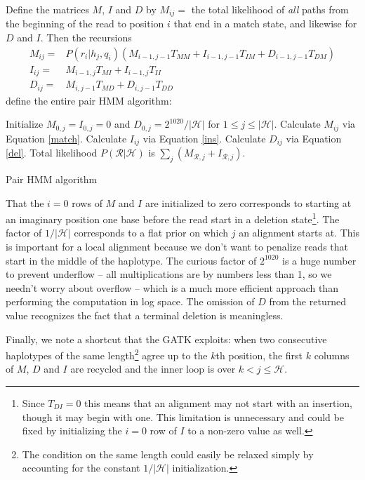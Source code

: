 \documentclass[nofootinbib,amssymb,amsmath]{revtex4}
\newcommand{\mc}[1]{\mathcal{#1}}
\begin{document}
Define the matrices $M$, $I$ and $D$ by $M_{ij} = $ the total likelihood of \textit{all} paths from the beginning of the read to position $i$ that end in a match state, and likewise for $D$ and $I$.  Then the recursions
\begin{align}
M_{ij} =& P(r_i | h_j, q_i) \left( M_{i-1,j-1} T_{MM} + I_{i-1,j-1} T_{IM} + D_{i-1,j-1} T_{DM} \right) \label{match} \\
I_{ij} =& M_{i-1,j} T_{MI} + I_{i-1,j} T_{II} \label{ins} \\
D_{ij} =& M_{i,j-1} T_{MD} + D_{i, j - 1} T_{DD} \label{del}
\end{align}
define the entire pair HMM algorithm:

\begin{algorithm}
\begin{algorithmic}[1]
\State Initialize $M_{0,j} = I_{0,j} = 0$ and $D_{0,j} = 2^{1020}/|\mc{H}|$ for $1 \le j \le |\mc{H}|$.
\For{$1 \le i \le | \mc{R} |$}
	\For{$1 \le j \le | \mc{H} |$}
		\State Calculate $M_{ij}$ via Equation \ref{match}.
		\State Calculate $I_{ij}$ via Equation \ref{ins}.
		\State Calculate $D_{ij}$ via Equation \ref{del}.
	\EndFor
\EndFor
\State Total likelihood $P(\mc{R} | \mc{H})$ is $\sum_j \left(M_{\mc{R},j} + I_{\mc{R},j} \right)$.
\end{algorithmic}
\caption{Pair HMM algorithm}
\label{pairHMM}
\end{algorithm}

That the $i = 0$ rows of $M$ and $I$ are initialized to zero corresponds to starting at an imaginary position one base before the read start in a deletion state\footnote{Since $T_{DI} = 0$ this means that an alignment may not start with an insertion, though it may begin with one.  This limitation is unnecessary and could be fixed by initializing the $i = 0$ row of $I$ to a non-zero value as well.}.  The factor of $1/|\mc{H}|$ corresponds to a flat prior on which $j$ an alignment starts at.  This is important for a local alignment because we don't want to penalize reads that start in the middle of the haplotype.  The curious factor of $2^{1020}$ is a huge number to prevent underflow -- all multiplications are by numbers less than 1, so we needn't worry about overflow -- which is a much more efficient approach than performing the computation in log space.  The omission of $D$ from the returned value recognizes the fact that a terminal deletion is meaningless.

Finally, we note a shortcut that the GATK exploits: when two consecutive haplotypes of the same length\footnote{The condition on the same length could easily be relaxed simply by accounting for the constant $1/|\mc{H}|$ initialization.}  agree up to the $k$th position, the first $k$ columns of $M$, $D$ and $I$ are recycled and the inner loop is over $k < j \le \mc{H}$.
\end{document}
